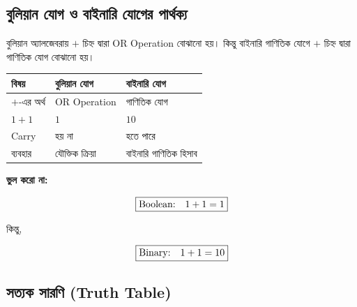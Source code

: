 
\subsection{বুলিয়ান যোগ ও বাইনারি যোগের পার্থক্য}

বুলিয়ান অ্যালজেবরায় \(+\) চিহ্ন দ্বারা
\textenglish{OR Operation} বোঝানো হয়।
কিন্তু বাইনারি গাণিতিক যোগে \(+\) চিহ্ন দ্বারা
গাণিতিক যোগ বোঝানো হয়।

\begin{center}
\begin{tabularx}{\textwidth}{|L{0.25\textwidth}|Y|Y|}
\hline
{}
\textbf{বিষয়} &
\textbf{বুলিয়ান যোগ} &
\textbf{বাইনারি যোগ} \\
\hline

\(+\)-এর অর্থ &
\textenglish{OR Operation} &
গাণিতিক যোগ \\
\hline

\(1+1\) &
\(1\) &
\(10\) \\
\hline

\textenglish{Carry} &
হয় না &
হতে পারে \\
\hline

ব্যবহার &
যৌক্তিক ক্রিয়া &
বাইনারি গাণিতিক হিসাব \\
\hline
\end{tabularx}
\end{center}

\par\begingroup

\textbf{ভুল করো না:}

\[
\boxed{
\text{\textenglish{Boolean:}}\quad 1+1=1
}
\]

কিন্তু,

\[
\boxed{
\text{\textenglish{Binary:}}\quad 1+1=10
}
\]
\par\endgroup



\subsection{সত্যক সারণি
(\textenglish{Truth Table})}

\par\begingroup

